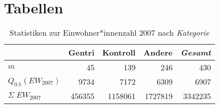 \section{Tabellen}

\begin{table}[h]
\centering
\begin{tabular}{@{}lrrrr@{}}
\toprule
                                       & \multicolumn{1}{r}{{\bf Gentri}} & \multicolumn{1}{r}{{\bf Kontroll}} & \multicolumn{1}{r}{{\bf Andere}} & \multicolumn{1}{r}{{\bf \textit{Gesamt}}} \\ \midrule
$m$                                    & 45                               & 139                                & 246                              & 430                                  \\
$Q_{0.5}(EW_{2007})$                   & 9734                             & 7172                               & 6309                             & 6907                                 \\
$\Sigma\;EW_{2007}$                    & 456355                           & 1158061                            & 1727819                          & 3342235                              \\ \bottomrule
\end{tabular}
\caption{Statistiken zur Einwohner*innenzahl 2007 nach \textit{Kategorie}}\label{tab:KategorieEW}
\end{table}            
